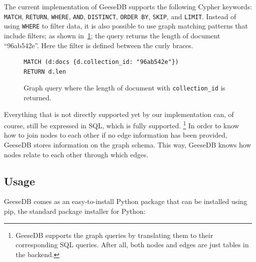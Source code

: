 The current implementation of  GeeseDB supports the following Cypher keywords: \texttt{MATCH}, \texttt{RETURN}, \texttt{WHERE}, \texttt{AND}, \texttt{DISTINCT}, \texttt{ORDER BY}, \texttt{SKIP}, and \texttt{LIMIT}. Instead of using \texttt{WHERE} to filter data, it is also possible to use graph matching patterns that include filters; as shown in~\cref{fig:graph_query2}; the query returns the length of document ``96ab542e''. Here the filter is defined between the curly braces. 
\begin{figure}
	\begin{verbatim}
MATCH (d:docs {d.collection_id: "96ab542e"})
RETURN d.len
	\end{verbatim}
	\caption{Graph query where the length of document with \texttt{collection\_id} is returned.}
	\label{fig:graph_query2}
\end{figure}
Everything that is not directly supported yet by our implementation can, of course, still be expressed in SQL, which is fully supported. \footnote{GeeseDB supports the graph queries by translating them to their corresponding SQL queries. After all, both nodes and edges are just tables in the backend.} In order to know how to join nodes to each other if no edge information has been provided, GeeseDB stores information on the graph schema. This way, GeeseDB knows how nodes relate to each other through which edges. 

\subsection{Usage}
GeeseDB comes as an easy-to-install Python package that can be installed using pip, the standard package installer for Python:

